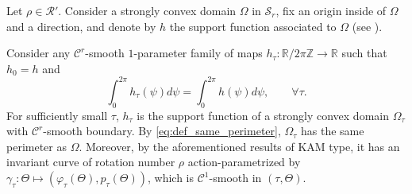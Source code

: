 \documentclass[a4paper]{article}
\theoremstyle{definition}
\def\R{\mathbb{R}}
\def\Z{\mathbb{Z}}
\begin{document}
Let $\rho\in\mathscr R'$. Consider a strongly convex domain $\Omega$ in $\mathscr S_r$, fix an origin inside of $\Omega$ and a direction, and denote by $h$ the support function associated to $\Omega$ (see \cite{Bialyellipses}).

Consider any $\mathscr C^r$-smooth $1$-parameter family of maps $h_{\tau}:\R/2\pi\Z\to\R$ such that $h_0=h$ and 
\begin{equation}
\label{eq:def_same_perimeter}
\int_0^{2\pi}h_{\tau}(\psi)d\psi = \int_0^{2\pi}h(\psi)d\psi,
\qquad \forall\tau.
\end{equation}
For sufficiently small $\tau$, $h_{\tau}$ is the support function of a strongly convex domain $\Omega_{\tau}$ with $\mathscr C^r$-smooth boundary. By \eqref{eq:def_same_perimeter}, $\Omega_{\tau}$ has the same perimeter as $\Omega$. 
Moreover, by the aforementioned results of KAM type, it has an invariant curve of rotation number $\rho$ action-parametrized by $\gamma_{\tau}:\Theta\mapsto(\varphi_{\tau}(\Theta),p_{\tau}(\Theta))$, which is $\mathscr C^1$-smooth in $(\tau,\Theta)$.
\end{document}

